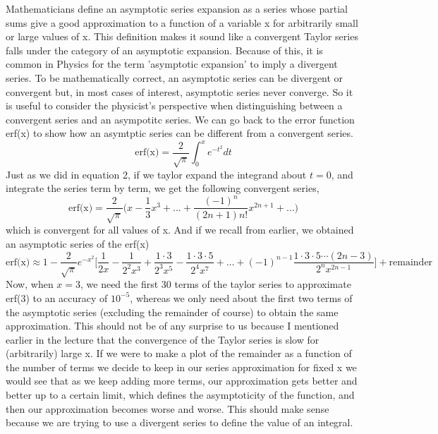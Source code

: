 \documentclass{article}
\newcommand{\be}{\begin{equation}}
\newcommand{\ee}{\end{equation}}
\begin{document}
Mathematicians define an asymptotic series expansion as a series whose partial sums give a good approximation to a function of a variable x for arbitrarily small or large values of x.
This definition makes it sound like a convergent Taylor series falls under the category of an asymptotic expansion.
Because of this, it is common in Physics for the term 'asymptotic expansion' to imply a divergent series.
To be mathematically correct, an asymptotic series can be divergent or convergent but, in most cases of interest, asymptotic series never converge.
So it is useful to consider the physicist's perspective when distinguishing between a convergent series and an asympotitc series.
We can go back to the error function erf(x) to show how an asymtptic series can be different from a convergent series.
\be
  \text{erf(x)} = \frac{2}{\sqrt{\pi}} \int_0^x e^{-t^2} dt
\ee
Just as we did in equation 2, if we taylor expand the integrand about $t=0$, and integrate the series term by term, we get the following convergent series,
\be
  \text{erf(x)} = \frac{2}{\sqrt{\pi}} \Big( x - \frac{1}{3}x^3 + \hdots + \frac{(-1)^n}{(2n+1)n!} x^{2n+1} + \hdots \Big)
\ee
which is convergent for all values of x.
And if we recall from earlier, we obtained an asymptotic series of the erf(x)
\be
  \text{erf(x)} \approx 1 - \frac{2}{\sqrt{\pi}} e^{-x^2} \Big[ \frac{1}{2x} - \frac{1}{2^2 x^3} + \frac{1 \cdot 3}{2^3 x^5} - \frac{1 \cdot 3 \cdot 5}{2^4 x^7} + \hdots + (-1)^{n-1} \frac{1 \cdot 3 \cdot 5 \cdots (2n-3)}{2^n x^{2n-1}} \Big] + \text{remainder}
\ee
Now, when $x=3$, we need the first 30 terms of the taylor series to approximate erf(3) to an accuracy of $10^{-5}$, whereas we only need about the first two terms of the asymptotic series (excluding the remainder of course) to obtain the same approximation.
This should not be of any surprise to us because I mentioned earlier in the lecture that the convergence of the Taylor series is slow for (arbitrarily) large x.
If we were to make a plot of the remainder as a function of the number of terms we decide to keep in our series approximation for fixed x
we would see that as we keep adding more terms, our approximation gets better and better up to a certain limit, which defines the asymptoticity of the function, and then our approximation becomes worse and worse.
This should make sense because we are trying to use a divergent series to define the value of an integral.
\end{document}
